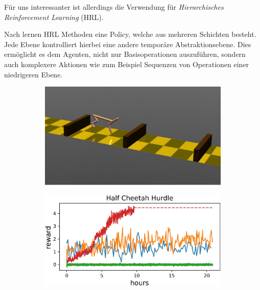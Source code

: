 \smallspace

Für uns interessanter ist allerdings die Verwendung für \textit{Hierarchisches Reinforcement Learning} (HRL). 

Nach \cite{BerliacHierachialRL2019} lernen HRL Methoden eine Policy, welche aus mehreren Schichten besteht. Jede Ebene kontrolliert hierbei eine andere temporäre Abstraktionsebene. Dies ermöglicht es dem Agenten, nicht nur Basisoperationen auszuführen, sondern auch komplexere Aktionen wie zum Beispiel Sequenzen von Operationen einer niedrigeren Ebene.

\smallspace

\begin{figure}[h]
\begin{subfigure}{0.38\textwidth}
\includegraphics[width=\textwidth, keepaspectratio=true]{images/cheetah_hurdle_image.JPG}
\caption{} \label{img:cheetah_hurdle_img}
\end{subfigure}
\begin{subfigure}{0.4\textwidth}
\includegraphics[width=\textwidth, keepaspectratio=true]{images/cheetah_hurdle.JPG}
\caption{} \label{img:cheetah_hurdle_graph}
\end{subfigure}

\end{figure}
